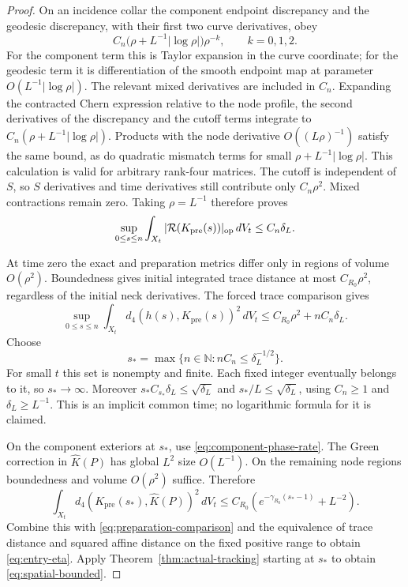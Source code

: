 \begin{proof}
On an incidence collar the component endpoint discrepancy and the
geodesic discrepancy, with their first two curve derivatives, obey
\begin{equation}\label{eq:preparation-collar}
 C_n\bigl(\rho+L^{-1}|\log\rho|\bigr)\rho^{-k},
                    \qquad k=0,1,2.
\end{equation}
For the component term this is Taylor expansion in the curve coordinate;
for the geodesic term it is differentiation of the smooth endpoint
map at parameter $O(L^{-1}|\log\rho|)$. The relevant mixed
derivatives are included in $C_n$. Expanding the contracted Chern
expression relative to the node profile, the second derivatives of
the discrepancy and the cutoff terms integrate to
$C_n(\rho+L^{-1}|\log\rho|)$. Products with the node derivative
$O((L\rho)^{-1})$ satisfy the same bound, as do quadratic mismatch
terms for small $\rho+L^{-1}|\log\rho|$. This calculation is valid
for arbitrary rank-four matrices. The cutoff is independent of $S$,
so $S$ derivatives and time derivatives still contribute only
$C_n\rho^2$. Mixed contractions remain zero. Taking $\rho=L^{-1}$
therefore proves
\begin{equation}\label{eq:preparation-residual}
 \sup_{0\le s\le n}\int_{X_t}
       |\mathcal R(K_{\mathrm{pre}}(s))|_{\mathrm{op}}\,dV_t
                  \le C_n\delta_L.
\end{equation}

At time zero the exact and preparation metrics differ only in regions
of volume $O(\rho^2)$. Boundedness gives initial integrated trace
distance at most $C_{R_0}\rho^2$, regardless of the initial neck
derivatives. The forced trace comparison gives
\begin{equation}\label{eq:preparation-comparison}
 \sup_{0\le s\le n}\int_{X_t}
 d_4(h(s),K_{\mathrm{pre}}(s))^2\,dV_t
                \le C_{R_0}\rho^2+nC_n\delta_L.
\end{equation}
Choose
\begin{equation}\label{eq:preparation-time}
 s_*=\max\{n\in\mathbb N:nC_n\le\delta_L^{-1/2}\}.
\end{equation}
For small $t$ this set is nonempty and finite. Each fixed integer
eventually belongs to it, so $s_*\to\infty$. Moreover
$s_*C_{s_*}\delta_L\le\sqrt{\delta_L}$ and
$s_*/L\le\sqrt{\delta_L}$, using $C_n\ge1$ and $\delta_L\ge L^{-1}$.
This is an implicit common time; no logarithmic formula for it is claimed.

On the component exteriors at $s_*$, use
\eqref{eq:component-phase-rate}. The Green correction in
$\widehat K(P)$ has global $L^2$ size $O(L^{-1})$.
On the remaining node regions boundedness and volume $O(\rho^2)$
suffice. Therefore
\[
 \int_{X_t}d_4(K_{\mathrm{pre}}(s_*),\widehat K(P))^2\,dV_t
       \le C_{R_0}(e^{-\gamma_{R_0}(s_*-1)}+L^{-2}).
\]
Combine this with \eqref{eq:preparation-comparison} and the equivalence
of trace distance and squared affine distance on the fixed positive
range to obtain \eqref{eq:entry-eta}. Apply
Theorem~\ref{thm:actual-tracking} starting at $s_*$ to obtain
\eqref{eq:spatial-bounded}.


\end{proof}
